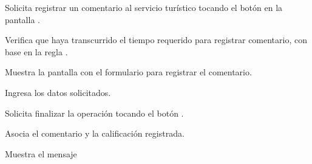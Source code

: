 	\begin{UCtrayectoria}
		 
		\UCpaso [\UCactor] Solicita registrar un comentario al servicio turístico tocando el botón  en la pantalla .
		
		\UCpaso Verifica que haya transcurrido el tiempo requerido para registrar comentario, con base en la regla . 
		
		\UCpaso Muestra la pantalla  con el formulario para registrar el comentario.
		
		\UCpaso [\UCactor] Ingresa los datos solicitados.
		
		\UCpaso [\UCactor] Solicita finalizar la operación tocando el botón .
		
		\UCpaso Asocia el comentario y la calificación registrada. 
		
		\UCpaso Muestra el mensaje 
	\end{UCtrayectoria}
